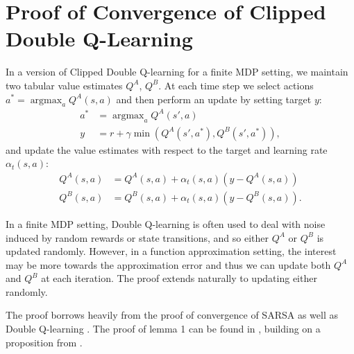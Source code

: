 \documentclass{article}
\newcommand{\y}{\gamma}
\DeclareMathOperator*{\argmax}{argmax}
\begin{document}
\section{Proof of Convergence of Clipped Double Q-Learning} \label{sec:sm_proof}

In a version of Clipped Double Q-learning for a finite MDP setting, we maintain two tabular value estimates $Q^A$, $Q^B$. At each time step we select actions $a^* = \argmax_a Q^A(s,a)$ and then perform an update by setting target $y$:
\begin{equation}
\begin{aligned}
a^* &= \argmax_a Q^A(s',a) \\
y &= r + \y \min(Q^A(s',a^*), Q^B(s',a^*)),
\end{aligned}
\end{equation}
and update the value estimates with respect to the target and learning rate $\alpha_t(s,a)$: 
\begin{equation}
\begin{aligned}
Q^A(s,a) &= Q^A(s,a) + \alpha_t(s,a)(y - Q^A(s,a)) \\
Q^B(s,a) &= Q^B(s,a) + \alpha_t(s,a)(y - Q^B(s,a)). 
\end{aligned}
\end{equation}

In a finite MDP setting, Double Q-learning is often used to deal with noise induced by random rewards or state transitions, and so either $Q^A$ or $Q^B$ is updated randomly. However, in a function approximation setting, the interest may be more towards the approximation error and thus we can update both $Q^A$ and $Q^B$ at each iteration. The proof extends naturally to updating either randomly. 

The proof borrows heavily from the proof of convergence of SARSA \cite{singh2000convergence} as well as Double Q-learning \cite{hasselt2010double}. The proof of lemma 1 can be found in \citet{singh2000convergence}, building on a proposition from \citet{bertsekas1995dynamic}. 
\end{document}
